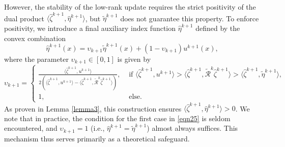\documentclass[onefignum,onetabnum]{siamart190516}
\numberwithin{equation}{section}
\begin{document}
However, the stability of the low-rank update requires the strict positivity of the dual product $\langle \hat{\zeta}^{k+1}, \hat{\eta}^{k+1} \rangle$, but $\tilde{\eta}^{k+1}$ does not guarantee this property.
To enforce positivity, we introduce a final auxiliary index function $\hat{\eta}^{k+1}$ defined by the convex combination
\begin{equation}\label{eqn24}
\hat{\eta}^{k+1}(x) = \upsilon_{k+1}\tilde{\eta}^{k+1}(x) + (1-\upsilon_{k+1})u^{k+1}(x),
\end{equation}
where the parameter $\upsilon_{k+1} \in [0,1]$ is given by
\begin{equation}\label{eqn25}
\upsilon_{k+1} =\begin{cases}
\frac{\langle \hat{\zeta}^{k+1}, u^{k+1} \rangle}{2\left( \langle \hat{\zeta}^{k+1}, u^{k+1} \rangle - \langle \hat{\zeta}^{k+1}, \widetilde{\mathcal{R}}^{k}\hat{\zeta}^{k+1} \rangle \right)},&\text{ if }\langle\hat{\zeta}^{k+1},u^{k+1}\rangle>\langle \hat{\zeta}^{k+1},\widetilde{\mathcal{R}}^{k}\hat{\zeta}^{k+1}\rangle>\langle \hat{\zeta}^{k+1},\tilde{\eta}^{k+1}\rangle,\\
1,&\text{ else}.
\end{cases}
\end{equation}
As proven in Lemma \ref{lemma3}, this construction ensures $\langle \hat{\zeta}^{k+1}, \hat{\eta}^{k+1} \rangle > 0$.
We note that in practice, the condition for the first case in \eqref{eqn25} is seldom encountered, and $\upsilon_{k+1} = 1$ (i.e., $\hat{\eta}^{k+1} = \tilde{\eta}^{k+1}$) almost always suffices.
This mechanism thus serves primarily as a theoretical safeguard.
\end{document}
